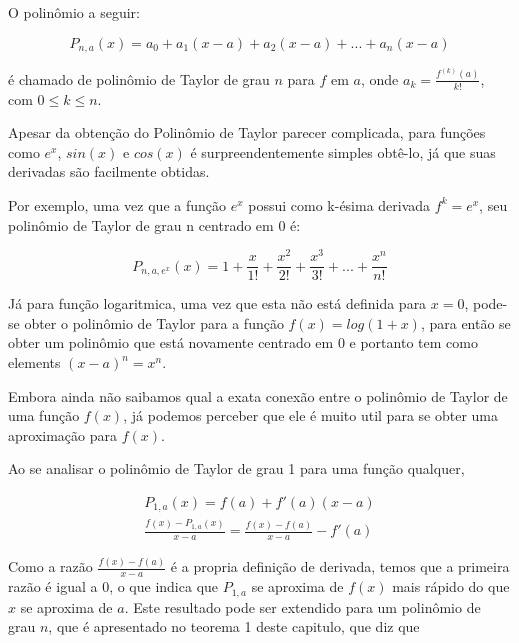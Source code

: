 \documentclass[a4paper, 12pt]{article}
\begin{document}
O polinômio a seguir:

\begin{centering}
	\begin{equation}
		\nonumber P_{n,a}(x) = a_0 + a_1(x-a) + a_2(x-a) + ... + a_n(x-a)
	\end{equation}
\end{centering}

é chamado de polinômio de Taylor de grau $n$ para $f$ em $a$,
onde $a_k = \frac{f^{(k)}(a)}{k!}$, com $0 \leq k \leq n$.

Apesar da obtenção do Polinômio de Taylor parecer complicada, para funções como
$e^x$, $sin(x)$ e $cos(x)$ é surpreendentemente simples obtê-lo, já que suas derivadas são facilmente obtidas.

Por exemplo, uma vez que a função $e^x$ possui como k-ésima derivada $f^{k} = e^x$, seu
polinômio de Taylor de grau n centrado em 0 é:

\begin{centering}
	\begin{equation}
		\nonumber P_{n,a,e^x}(x) = 1 + \frac{x}{1!} + \frac{x^2}{2!} + \frac{x^3}{3!} + ...  + \frac{x^n}{n!}
	\end{equation}
\end{centering}

Já para função logaritmica, uma vez que esta não está definida para $x = 0$, pode-se obter o
polinômio de Taylor para a função $f(x) = log(1+x)$, para então se obter um polinômio que
está novamente centrado em $0$ e portanto tem como elements $(x-a)^n = x^n$.

Embora ainda não saibamos qual a exata conexão entre o polinômio de Taylor de uma função $f(x)$,
já podemos perceber que ele é muito util para se obter uma aproximação para $f(x)$.

Ao se analisar o polinômio de Taylor de grau 1 para uma função qualquer,

\begin{centering}
	\begin{align*}
		P_{1,a}(x) = f(a) + f'(a)(x-a) \\
		\frac{f(x) - P_{1,a}(x)}{x-a} = \frac{f(x) - f(a)}{x-a} - f'(a)
	\end{align*}
\end{centering}

Como a razão $\frac{f(x) - f(a)}{x-a}$ é a propria definição de derivada, temos que a primeira
razão é igual a $0$, o que indica que $P_{1,a}$ se aproxima de $f(x)$ mais rápido do que $x$
se aproxima de $a$. Este resultado pode ser extendido para um polinômio de grau $n$, que é
apresentado no teorema 1 deste capitulo, que diz que
\end{document}

